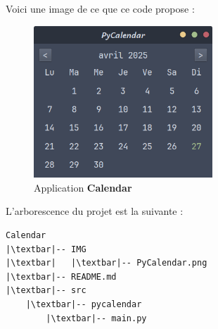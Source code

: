 Voici une image de ce que ce code propose :
\begin{figure}[h!]
    \centering
    \includegraphics[width=0.6\textwidth]{IMG/PyCalendar.png}
    \caption{Application \textbf{Calendar}}
\end{figure}

L'arborescence du projet est la suivante :
\begin{lstlisting}[style=tree]
Calendar
|\textbar|-- IMG
|\textbar|   |\textbar|-- PyCalendar.png
|\textbar|-- README.md
|\textbar|-- src
    |\textbar|-- pycalendar
        |\textbar|-- main.py
\end{lstlisting}
